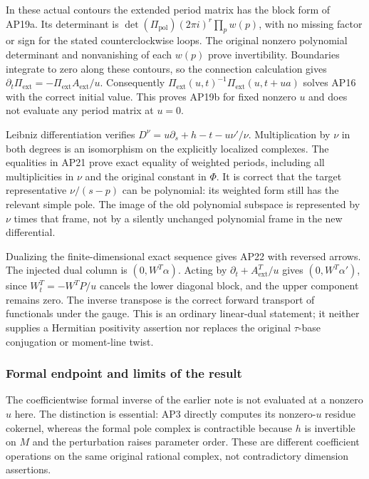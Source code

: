 In these actual contours the extended period matrix has the block form of AP19a. Its determinant is \(\det(\Pi_{\mathrm{pol}})(2\pi i)^r\prod_p w(p)\), with no missing factor or sign for the stated counterclockwise loops. The original nonzero polynomial determinant and nonvanishing of each \(w(p)\) prove invertibility. Boundaries integrate to zero along these contours, so the connection calculation gives \(\partial_t\Pi_{\mathrm{ext}}=-\Pi_{\mathrm{ext}}A_{\mathrm{ext}}/u\). Consequently \(\Pi_{\mathrm{ext}}(u,t)^{-1}\Pi_{\mathrm{ext}}(u,t+ua)\) solves AP16 with the correct initial value. This proves AP19b for fixed nonzero \(u\) and does not evaluate any period matrix at \(u=0\).

Leibniz differentiation verifies \(D^\nu=u\partial_s+h-t-u\nu'/\nu\). Multiplication by \(\nu\) in both degrees is an isomorphism on the explicitly localized complexes. The equalities in AP21 prove exact equality of weighted periods, including all multiplicities in \(\nu\) and the original constant in \(\Phi\). It is correct that the target representative \(\nu/(s-p)\) can be polynomial: its weighted form still has the relevant simple pole. The image of the old polynomial subspace is represented by \(\nu\) times that frame, not by a silently unchanged polynomial frame in the new differential.

Dualizing the finite-dimensional exact sequence gives AP22 with reversed arrows. The injected dual column is \((0,W^T\alpha)\). Acting by \(\partial_t+A_{\mathrm{ext}}^T/u\) gives \((0,W^T\alpha')\), since \(W_t^T=-W^T P/u\) cancels the lower diagonal block, and the upper component remains zero. The inverse transpose is the correct forward transport of functionals under the gauge. This is an ordinary linear-dual statement; it neither supplies a Hermitian positivity assertion nor replaces the original \(\tau\)-base conjugation or moment-line twist.

\subsubsection{Formal endpoint and limits of the result}\label{endpoint-analytic_pole_review--formal-endpoint-and-limits-of-the-result}

The coefficientwise formal inverse of the earlier note is not evaluated at a nonzero \(u\) here. The distinction is essential: AP3 directly computes its nonzero-\(u\) residue cokernel, whereas the formal pole complex is contractible because \(h\) is invertible on \(M\) and the perturbation raises parameter order. These are different coefficient operations on the same original rational complex, not contradictory dimension assertions.

